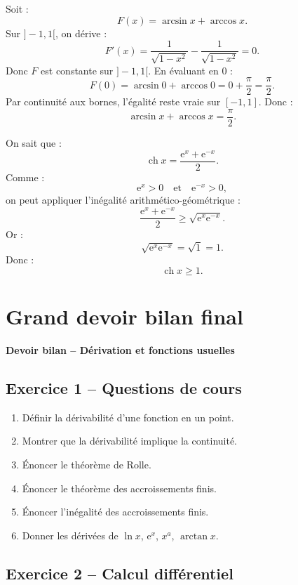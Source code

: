 \documentclass[11pt,a4paper]{article}
\newcommand{\e}{\mathrm e}
\newcommand{\ch}{\operatorname{ch}}
\begin{document}
\begin{correctionbox}[11]
Soit :
\[
F(x)=\arcsin x+\arccos x.
\]
Sur \(]-1,1[\), on dérive :
\[
F'(x)=\frac1{\sqrt{1-x^2}}-\frac1{\sqrt{1-x^2}}=0.
\]
Donc \(F\) est constante sur \(]-1,1[\).  
En évaluant en \(0\) :
\[
F(0)=\arcsin 0+\arccos 0=0+\frac{\pi}{2}=\frac{\pi}{2}.
\]
Par continuité aux bornes, l'égalité reste vraie sur \([-1,1]\).  
Donc :
\[
\arcsin x+\arccos x=\frac{\pi}{2}.
\]
\end{correctionbox}

\begin{correctionbox}[12]
On sait que :
\[
\ch x=\frac{\e^x+\e^{-x}}2.
\]
Comme :
\[
\e^x>0
\quad\text{et}\quad
\e^{-x}>0,
\]
on peut appliquer l'inégalité arithmético-géométrique :
\[
\frac{\e^x+\e^{-x}}2\geq \sqrt{\e^x\e^{-x}}.
\]
Or :
\[
\sqrt{\e^x\e^{-x}}=\sqrt{1}=1.
\]
Donc :
\[
\ch x\geq1.
\]
\end{correctionbox}

\newpage
\section{Grand devoir bilan final}

\begin{center}
\Large\textbf{Devoir bilan -- Dérivation et fonctions usuelles}
\end{center}

\subsection*{Exercice 1 -- Questions de cours}

\begin{enumerate}
    \item Définir la dérivabilité d'une fonction en un point.
    \item Montrer que la dérivabilité implique la continuité.
    \item Énoncer le théorème de Rolle.
    \item Énoncer le théorème des accroissements finis.
    \item Énoncer l'inégalité des accroissements finis.
    \item Donner les dérivées de \(\ln x\), \(\e^x\), \(x^a\), \(\arctan x\).
\end{enumerate}

\subsection*{Exercice 2 -- Calcul différentiel}
\end{document}
